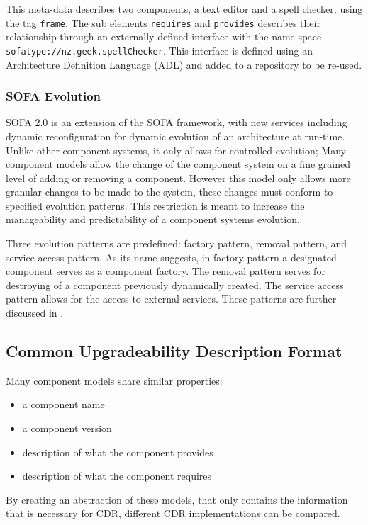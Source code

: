 This meta-data describes two components, a text editor and a spell checker, using the tag \texttt{frame}.
The sub elements \texttt{requires} and \texttt{provides} describes their relationship through an externally defined interface with the name-space \texttt{sofatype://nz.geek.spellChecker}.
This interface is defined using an Architecture Definition Language (ADL) and added to a repository to be re-used. 


\subsubsection{SOFA Evolution}
SOFA 2.0 is an extension of the SOFA framework, with new services including dynamic reconfiguration for dynamic evolution of an architecture at run-time. 
Unlike other component systems,
it only allows for controlled evolution; 
Many component models allow the change of the component system on a fine grained level of adding or removing a component.
However this model only allows more granular changes to be made to the system, these changes must conform to specified evolution patterns.
This restriction is meant to increase the manageability and predictability of a component systems evolution. 

Three evolution patterns are predefined: factory pattern, removal pattern, and service access pattern.
As its name suggests, in factory pattern a designated component serves as a component factory. 
The removal pattern serves for destroying of a component previously dynamically created.
The service access pattern allows for the access to external services.
These patterns are further discussed in \citep{Hnetynka2006}.


\subsection{Common Upgradeability Description Format}
Many component models share similar properties:
\begin{itemize}
  \item a component name
  \item a component version
  \item description of what the component provides
  \item description of what the component requires
\end{itemize} 

By creating an abstraction of these models, that only contains the information that is necessary for CDR, different CDR implementations can be compared.

